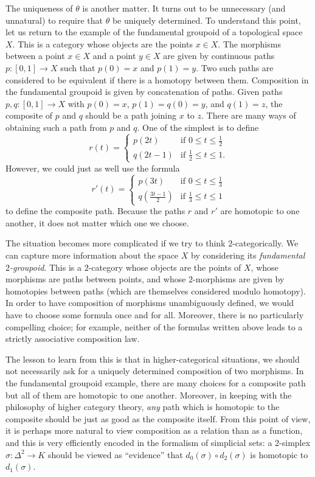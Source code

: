 The uniqueness of $\theta$ is another matter. It turns out to be
unnecessary (and unnatural) to require that $\theta$ be uniquely
determined. To understand this point, let us return to 
the example of the fundamental groupoid of a topological space
$X$. This is a category whose objects are the points $x \in X$.
The morphisms between a point $x \in X$ and a point $y \in X$ are given by
continuous paths $p: [0,1] \rightarrow X$ such that $p(0)=x$ and
$p(1)=y$. Two such paths are considered to be equivalent if there
is a homotopy between them. Composition in the fundamental
groupoid is given by concatenation of paths. Given paths $p,q:
[0,1] \rightarrow X$ with $p(0)=x$, $p(1)=q(0)=y$, and $q(1)=z$,
the composite of $p$ and $q$ should be a path joining $x$ to $z$.
There are many ways of obtaining such a path from $p$ and $q$. One
of the simplest is to define
$$r(t) = \begin{cases} p(2t) & \text{if } 0 \leq t \leq \frac{1}{2} \\
q(2t-1) & \text{if } \frac{1}{2} \leq t \leq 1. \end{cases}$$
However, we could just as well use the formula
$$r'(t) = \begin{cases} p(3t) & \text{if } 0 \leq t \leq \frac{1}{3} \\
q(\frac{3t-1}{2}) & \text{if } \frac{1}{3} \leq t \leq 1
\end{cases}$$
to define the composite path. Because the paths $r$ and $r'$ are homotopic to one another, it does not matter which one we choose.

The situation becomes more complicated if we try to think
$2$-categorically. We can capture more information about the space
$X$ by considering its {\it fundamental $2$-groupoid}. This is a
$2$-category whose objects are the points of $X$, whose morphisms
are paths between points, and whose $2$-morphisms are given by
homotopies between paths (which are themselves considered modulo
homotopy). In order to have composition of morphisms unambiguously defined, we would have to choose some formula once and for all.
Moreover, there is no particularly compelling choice; for example,
neither of the formulas written above leads to a strictly associative composition law.

The lesson to learn from this is that in higher-categorical
situations, we should not necessarily ask for a uniquely
determined composition of two morphisms. In the fundamental groupoid
example, there are many choices for a composite path but all of
them are homotopic to one another. Moreover, in keeping with the
philosophy of higher category theory, {\em any} path which is
homotopic to the composite should be just as good as the
composite itself. From this point of view, it is perhaps more natural to
view composition as a relation than as a function, and this is
very efficiently encoded in the formalism of simplicial sets: a
$2$-simplex $\sigma: \Delta^2 \rightarrow K$ should be viewed as
``evidence'' that $d_0(\sigma) \circ d_2(\sigma)$ is homotopic to $d_1(\sigma)$.

